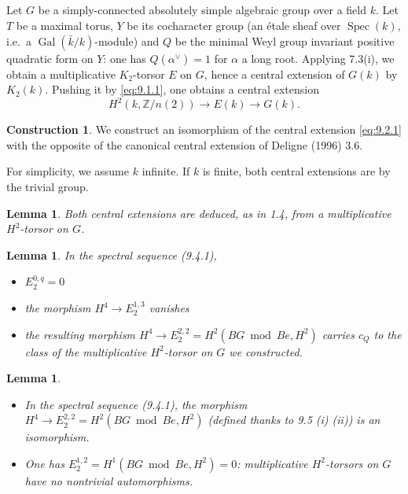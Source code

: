 \documentclass[11pt,a4paper]{article}
\theoremstyle{plain}
\newtheorem{lemma}[theorem]{Lemma}
\theoremstyle{definition}
\newtheorem{construction}[theorem]{Construction}
\DeclareMathOperator{\Spec}{Spec}
\DeclareMathOperator{\Gal}{Gal}
\newcommand{\bZ}{\mathbb{Z}}
\begin{document}
\subsection{}
Let $G$ be a simply-connected absolutely simple algebraic group over a field $k$. Let $T$ be a maximal torus, $Y$ be its cocharacter group (an \'etale sheaf over $\Spec(k)$, i.e.~a $\Gal(\bar{k}/k)$-module) and $Q$ be the minimal Weyl group invariant positive quadratic form on $Y$: one has $Q(\alpha^\vee) = 1$ for $\alpha$ a long root. Applying 7.3(i), we obtain a multiplicative $K_2$-torsor $E$ on $G$, hence a central extension of $G(k)$ by $K_2(k)$. Pushing it by \eqref{eq:9.1.1}, one obtains a central extension
\begin{equation}\label{eq:9.2.1}
H^2(k, \bZ/n(2)) \to E(k) \to G(k).
\end{equation}

\begin{construction}\label{constr:9.3}
We construct an isomorphism of the central extension \eqref{eq:9.2.1} with the opposite of the canonical central extension of Deligne (1996) 3.6.

For simplicity, we assume $k$ infinite. If $k$ is finite, both central extensions are by the trivial group.
\end{construction}

\begin{lemma}\label{lem:9.4}
Both central extensions are deduced, as in 1.4, from a multiplicative $H^2$-torsor on $G$.
\end{lemma}

\begin{lemma}\label{lem:9.5}
In the spectral sequence (9.4.1),
\begin{itemize}
\item[(i)] $E_2^{0,q} = 0$
\item[(ii)] the morphism $H^4 \to E_2^{1,3}$ vanishes
\item[(iii)] the resulting morphism $H^4 \to E_2^{2,2} = H^2(BG \bmod Be, H^2)$ carries $c_Q$ to the class of the multiplicative $H^2$-torsor on $G$ we constructed.
\end{itemize}
\end{lemma}

\begin{lemma}\label{lem:9.6}
\begin{itemize}
\item[(i)] In the spectral sequence (9.4.1), the morphism $H^4 \to E_2^{2,2} = H^2(BG \bmod Be, H^2)$ (defined thanks to 9.5 (i) (ii)) is an isomorphism.
\item[(ii)] One has $E_2^{1,2} = H^1(BG \bmod Be, H^2) = 0$: multiplicative $H^2$-torsors on $G$ have no nontrivial automorphisms.
\end{itemize}
\end{lemma}
\end{document}
